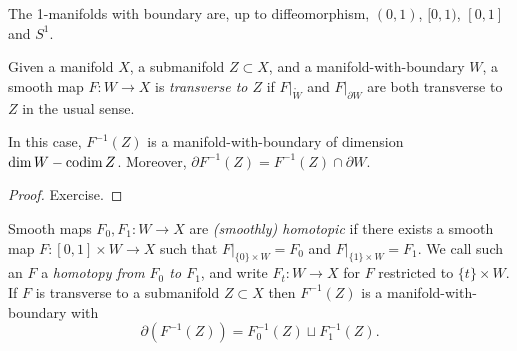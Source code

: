 \documentclass[a4paper,11pt]{article}
\begin{document}
	\begin{ex}
		The 1-manifolds with boundary are, up to diffeomorphism, $(0,1)$, $[0,1)$, $[0,1]$ and $S^1$.
	\end{ex}

	\begin{defi}
		Given a manifold $X$, a submanifold $Z \subset X$, and a manifold-with-boundary $W$, a smooth map $F: W \to X$ is \emph{transverse to $Z$} if $F\big|_{\mathring{W}}$ and $F\big|_{\partial W}$ are both transverse to $Z$ in the usual sense.
	\end{defi}

	\begin{prop}
		In this case, $F^{-1}(Z)$ is a manifold-with-boundary of dimension $\dim W - \operatorname{codim} Z$. Moreover, $\partial F^{-1}(Z) = F^{-1}(Z)\cap \partial W$. 
	\end{prop}

	\begin{proof}
		Exercise.
	\end{proof}

	\begin{ex}
		Smooth maps $F_0,F_1: W \to X$ are \emph{(smoothly) homotopic} if there exists a smooth map $F: [0,1]\times W \to X$ such that $F \big|_{\{0\}\times W} = F_0$ and $F\big|_{\{1\}\times W} = F_1$. We call such an $F$ a \emph{homotopy from $F_0$ to $F_1$}, and write $F_t : W \to X$ for $F$ restricted to $\{t\}\times W$. If $F$ is transverse to a submanifold $Z \subset X$ then $F^{-1}(Z)$ is a manifold-with-boundary with
		\[
			\partial(F^{-1}(Z)) = F_0^{-1}(Z) \sqcup F_1^{-1}(Z).
		\]
	\end{ex}
\end{document}
